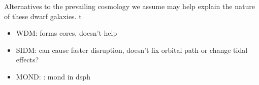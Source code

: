 Alternatives to the prevailing cosmology we assume may help explain the
nature of these dwarf galaxies. t

\begin{itemize}
\tightlist
\item
  WDM: forms cores, doesn't help
\item
  SIDM: can cause faster disruption, doesn't fix orbital path or change
  tidal effects?
\item
  MOND: \citet{sanchez-salcedo+hernandez2007}: mond in dsph
\end{itemize}

